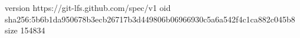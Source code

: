 version https://git-lfs.github.com/spec/v1
oid sha256:5b6b1da950678b3ecb26717b3d449806b06966930c5a6a542f4c1ca882c045b8
size 154834
